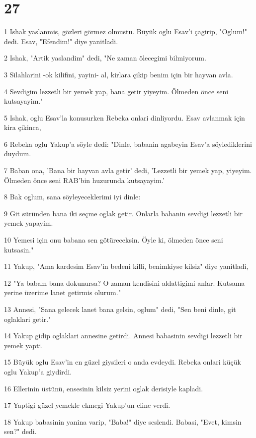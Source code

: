 \chapter{27}

\par 1 Ishak yaslanmis, gözleri görmez olmustu. Büyük oglu Esav'i çagirip, "Oglum!" dedi. Esav, "Efendim!" diye yanitladi.
\par 2 Ishak, "Artik yaslandim" dedi, "Ne zaman ölecegimi bilmiyorum.
\par 3 Silahlarini -ok kilifini, yayini- al, kirlara çikip benim için bir hayvan avla.
\par 4 Sevdigim lezzetli bir yemek yap, bana getir yiyeyim. Ölmeden önce seni kutsayayim."
\par 5 Ishak, oglu Esav'la konusurken Rebeka onlari dinliyordu. Esav avlanmak için kira çikinca,
\par 6 Rebeka oglu Yakup'a söyle dedi: "Dinle, babanin agabeyin Esav'a söylediklerini duydum.
\par 7 Baban ona, 'Bana bir hayvan avla getir' dedi, 'Lezzetli bir yemek yap, yiyeyim. Ölmeden önce seni RAB'bin huzurunda kutsayayim.'
\par 8 Bak oglum, sana söyleyeceklerimi iyi dinle:
\par 9 Git süründen bana iki seçme oglak getir. Onlarla babanin sevdigi lezzetli bir yemek yapayim.
\par 10 Yemesi için onu babana sen götüreceksin. Öyle ki, ölmeden önce seni kutsasin."
\par 11 Yakup, "Ama kardesim Esav'in bedeni killi, benimkiyse kilsiz" diye yanitladi,
\par 12 "Ya babam bana dokunursa? O zaman kendisini aldattigimi anlar. Kutsama yerine üzerime lanet getirmis olurum."
\par 13 Annesi, "Sana gelecek lanet bana gelsin, oglum" dedi, "Sen beni dinle, git oglaklari getir."
\par 14 Yakup gidip oglaklari annesine getirdi. Annesi babasinin sevdigi lezzetli bir yemek yapti.
\par 15 Büyük oglu Esav'in en güzel giysileri o anda evdeydi. Rebeka onlari küçük oglu Yakup'a giydirdi.
\par 16 Ellerinin üstünü, ensesinin kilsiz yerini oglak derisiyle kapladi.
\par 17 Yaptigi güzel yemekle ekmegi Yakup'un eline verdi.
\par 18 Yakup babasinin yanina varip, "Baba!" diye seslendi. Babasi, "Evet, kimsin sen?" dedi.
